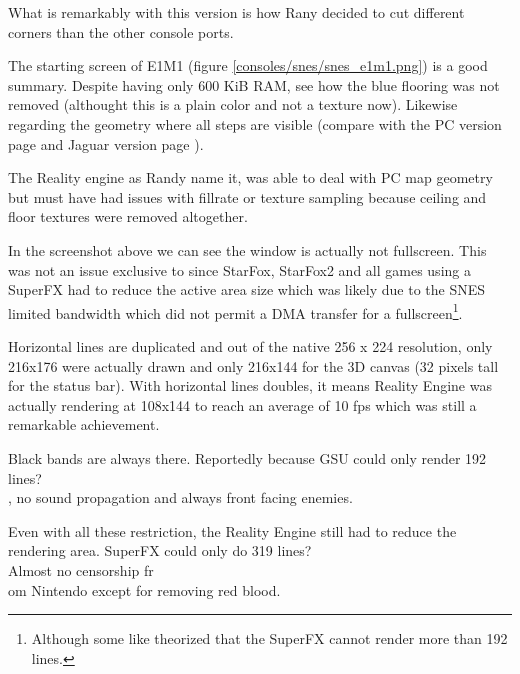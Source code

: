 What is remarkably with this version is how Rany decided to cut different corners than the other console ports.\\
\par
{}
\par
The starting screen of E1M1 (figure \ref{consoles/snes/snes_e1m1.png}) is a good summary. Despite having only 600 KiB RAM, see how the blue flooring was not removed (althought this is a plain color and not a texture now). Likewise regarding the geometry where all steps are visible (compare with the PC version page \pageref{} and Jaguar version page \pageref{doom_jaguar3.png}).\\
\par The Reality engine as Randy name it, was able to deal with PC map geometry but must have had issues with fillrate or texture sampling because ceiling and floor textures were removed altogether.













\par
In the screenshot above we can see the window is actually not fullscreen. This was not an issue exclusive to \doom since StarFox, StarFox2 and all games using a SuperFX had to reduce the active area size which was likely due to the SNES limited bandwidth which did not permit a DMA transfer for a fullscreen\footnote{Although some like  theorized that the SuperFX cannot render more than 192 lines.}.\\
\par
Horizontal lines are duplicated and out of the native 256 x 224 resolution, only 216x176 were actually drawn and only 216x144 for the 3D canvas (32 pixels tall for the status bar). With horizontal lines doubles, it means Reality Engine was actually rendering at 108x144 to reach an average of 10 fps which was still a remarkable achievement.\\
\pagebreak








\par
Black bands are always there. Reportedly because GSU could only render 192 lines?\\
, no sound propagation and always front facing enemies.\\
\par Even with all these restriction, the Reality Engine still had to reduce the rendering area.  SuperFX could only do 319 lines?\\
Almost no censorship fr\\
om Nintendo except for removing red blood.\\

